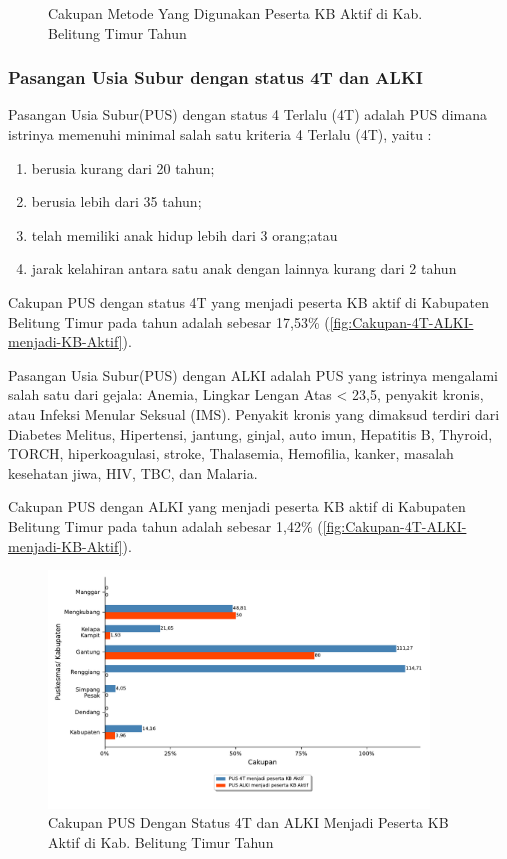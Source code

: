 \begin{figure}[H]
    \centering
    \caption{Cakupan Metode Yang Digunakan Peserta KB Aktif di Kab. Belitung Timur Tahun \tP}
    \label{fig:Cakupan-KB-aktif-c}
\end{figure}

\subsubsection{Pasangan Usia Subur dengan status 4T dan ALKI}
Pasangan Usia Subur(PUS) dengan status 4 Terlalu (4T) adalah PUS dimana istrinya memenuhi minimal salah satu kriteria 4 Terlalu (4T), yaitu :
\begin{enumerate}
	\item berusia kurang dari 20 tahun;
	\item berusia lebih dari 35 tahun;
	\item telah memiliki anak hidup lebih dari 3 orang;atau
	\item jarak kelahiran antara satu anak dengan lainnya kurang dari 2 tahun
\end{enumerate}

Cakupan PUS dengan status 4T yang menjadi peserta KB aktif di Kabupaten Belitung Timur pada tahun \tP  adalah sebesar 17,53\% (\autoref{fig:Cakupan-4T-ALKI-menjadi-KB-Aktif}).

Pasangan Usia Subur(PUS) dengan ALKI adalah PUS yang istrinya mengalami salah satu dari gejala: Anemia, Lingkar Lengan Atas < 23,5, penyakit kronis, atau Infeksi Menular Seksual (IMS).
Penyakit kronis yang dimaksud terdiri dari Diabetes Melitus, Hipertensi, jantung, ginjal, auto imun, Hepatitis B, Thyroid, TORCH, hiperkoagulasi, stroke, Thalasemia, Hemofilia, kanker, masalah kesehatan jiwa, HIV, TBC, dan Malaria.

Cakupan PUS dengan ALKI yang menjadi peserta KB aktif di Kabupaten Belitung Timur pada tahun \tP  adalah sebesar 1,42\% (\autoref{fig:Cakupan-4T-ALKI-menjadi-KB-Aktif}).

\begin{figure}[H]
	\centering
	\includegraphics[width=0.9\textwidth]{bab_05/bab_05_06a_KB4TALKI}
	\caption{Cakupan PUS Dengan Status 4T dan ALKI Menjadi Peserta KB Aktif di Kab. Belitung Timur Tahun \tP}
	\label{fig:Cakupan-4T-ALKI-menjadi-KB-Aktif}
\end{figure}

